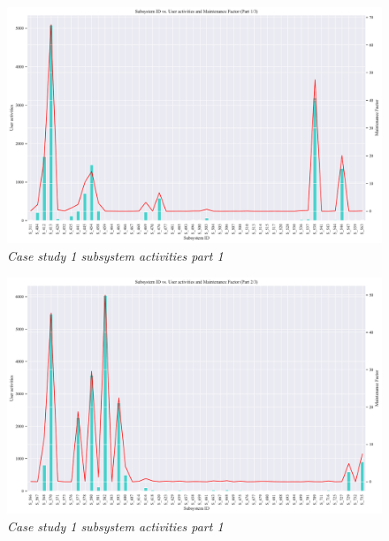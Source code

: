 \begin{landscape}
	\begin{figure}[!htb]
		\centering %
		\includegraphics[width=0.95\linewidth]{img/ch3/analysis/case_B_subsystems_1.pdf}
		\caption[Case study 1 subsystem activities part 1]
		{\textit{Case study 1 subsystem activities part 1}}\label{fig:ch3_saS1S24}
	\end{figure} 

	\begin{figure}[!htb]
		\centering %
		\includegraphics[width=0.95\linewidth]{img/ch3/analysis/case_B_subsystems_2.pdf}
		\caption[Case study 1 subsystem activities part 1]
		{\textit{Case study 1 subsystem activities part 1}}\label{fig:ch3_saS1S25}
	\end{figure} 


\end{landscape}
